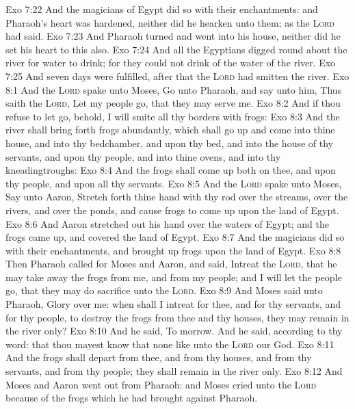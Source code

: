 \vs Exo 7:22 And the magicians of Egypt did so with their enchantments: and Pharaoh's heart was hardened, neither did he hearken unto them; as the \textsc{Lord} had said.
\vs Exo 7:23 And Pharaoh turned and went into his house, neither did he set his heart to this also.
\vs Exo 7:24 And all the Egyptians digged round about the river for water to drink; for they could not drink of the water of the river.
\vs Exo 7:25 And seven days were fulfilled, after that the \textsc{Lord} had smitten the river.
\vs Exo 8:1 And the \textsc{Lord} spake unto Moses, Go unto Pharaoh, and say unto him, Thus saith the \textsc{Lord}, Let my people go, that they may serve me.
\vs Exo 8:2 And if thou refuse to let  go, behold, I will smite all thy borders with frogs:
\vs Exo 8:3 And the river shall bring forth frogs abundantly, which shall go up and come into thine house, and into thy bedchamber, and upon thy bed, and into the house of thy servants, and upon thy people, and into thine ovens, and into thy kneadingtroughs:
\vs Exo 8:4 And the frogs shall come up both on thee, and upon thy people, and upon all thy servants.
\vs Exo 8:5 And the \textsc{Lord} spake unto Moses, Say unto Aaron, Stretch forth thine hand with thy rod over the streams, over the rivers, and over the ponds, and cause frogs to come up upon the land of Egypt.
\vs Exo 8:6 And Aaron stretched out his hand over the waters of Egypt; and the frogs came up, and covered the land of Egypt.
\vs Exo 8:7 And the magicians did so with their enchantments, and brought up frogs upon the land of Egypt.
\vs Exo 8:8 Then Pharaoh called for Moses and Aaron, and said, Intreat the \textsc{Lord}, that he may take away the frogs from me, and from my people; and I will let the people go, that they may do sacrifice unto the \textsc{Lord}.
\vs Exo 8:9 And Moses said unto Pharaoh, Glory over me: when shall I intreat for thee, and for thy servants, and for thy people, to destroy the frogs from thee and thy houses,  they may remain in the river only?
\vs Exo 8:10 And he said, To morrow. And he said,  according to thy word: that thou mayest know that  none like unto the \textsc{Lord} our God.
\vs Exo 8:11 And the frogs shall depart from thee, and from thy houses, and from thy servants, and from thy people; they shall remain in the river only.
\vs Exo 8:12 And Moses and Aaron went out from Pharaoh: and Moses cried unto the \textsc{Lord} because of the frogs which he had brought against Pharaoh.

